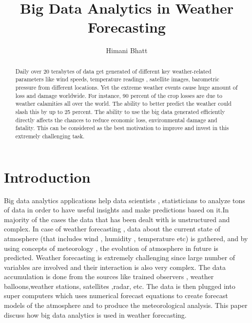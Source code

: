 \documentclass[sigconf]{acmart}
\begin{document}
\title{Big Data Analytics in Weather Forecasting}


\author{Himani Bhatt}



\renewcommand{\shortauthors}{H. Bhatt}



\begin{abstract}

Daily over 20 terabytes of data get generated  of different key weather-related parameters like wind speeds, temperature readings , satellite images, barometric pressure from different locations. Yet the extreme weather events cause huge amount of loss and damage worldwide. For instance, 90 percent of the crop losses are due to weather calamities all over the world. The ability to better predict the weather could slash this by up to 25 percent. The ability to use the big data generated efficiently directly affects the chances to reduce economic loss, environmental damage and fatality.  This can be considered as the best motivation to improve and invest in this extremely challenging task.

\end{abstract}


\maketitle

\section{Introduction} 

Big data analytics applications help data scientists , statisticians to analyze tons of data in order to have useful insights and make predictions based on it.In majority of the cases the data that has been dealt with is unstructured and complex. In case of weather forecasting , data about the current state of atmosphere (that includes wind , humidity , temperature etc) is gathered, and by using concepts of meteorology , the evolution of atmosphere in future is predicted. Weather forecasting is extremely challenging since large number of variables are involved and their interaction is also very complex.
The data accumulation is done from the sources like trained observers , weather balloons,weather stations, satellites ,radar, etc. The data is then plugged into super computers which uses numerical forecast equations to create forecast models of the atmosphere and to produce the meteorological analysis.
This paper discuss how big data analytics is used in weather forecasting.\cite{Book01}
\end{document}
